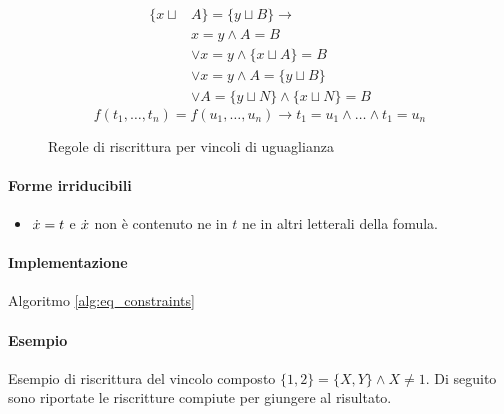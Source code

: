 \documentclass[12pt,a4paper,openright]{book} %
\begin{document}
\begin{figure}
\begin{tcolorbox}[colframe=black, colback=white, sharp corners]
\begin{equation}
\begin{split}
		\end{split}
		\end{equation}
		\begin{equation}
		\begin{split}
		\{ x \sqcup & A \} = \{ y \sqcup B \} \to \\
		& x = y \land A = B \\
		& \lor x = y \land \{ x \sqcup A \} = B \\
		& \lor x = y \land A = \{ y \sqcup B \} \\
		& \lor A = \{ y \sqcup N \} \land \{ x \sqcup N \} = B
		\end{split}
		\end{equation}
		\begin{equation}
		f(t_1, \ldots, t_n) = f(u_1, \ldots, u_n) \to t_1 = u_1 \land \ldots \land t_1 = u_n
		\end{equation}

	\end{tcolorbox}

	\caption{Regole di riscrittura per vincoli di uguaglianza}
	\label{fig:eq_constraints}
\end{figure}

\paragraph{Forme irriducibili}
\begin{itemize}
	\item $\dot{x} = t$ e $\dot{x}$ non è contenuto ne in $t$ ne in
          altri letterali della fomula.
\end{itemize}

\paragraph{Implementazione}
Algoritmo \ref{alg:eq_constraints}

\paragraph{Esempio}
Esempio di riscrittura del vincolo composto $\{1,2\} = \{X,Y\} \land X \neq 1$.
Di seguito sono riportate le riscritture compiute per giungere al risultato.
\end{document}
